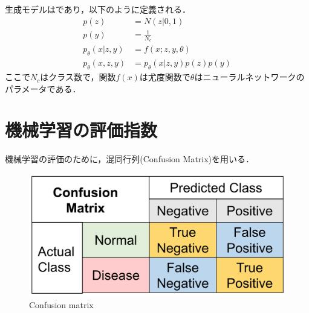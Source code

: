 生成モデルはであり，以下のように定義される．
\begin{align}\label{eq:m2_generative}
p(z) & = N (z| 0, 1)  \\
p(y) & = \frac{1}{N_c} \\
p_\theta (x|z, y) & = f(x; z, y, \theta) \\
p_\theta (x, z, y) & = p_\theta (x|z, y) p(z) p(y)
\end{align}
ここで$N_c$はクラス数で，関数$f(x)$は尤度関数で$\theta$はニューラルネットワークのパラメータである．

\section{機械学習の評価指数}
機械学習の評価のために，混同行列(Confusion Matrix)を用いる．

\begin{figure}[H]
	\centering
	\includegraphics[width=0.7\linewidth]{fig/chapter2/confusion_matrix}
	\caption{Confusion matrix}
	\label{fig:confusionmatrix}
\end{figure}

